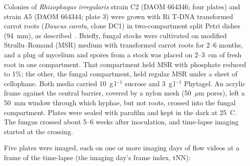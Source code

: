 
Colonies of \textit{Rhizophagus irregularis} strain C2 (DAOM 664346; four plates) and strain A5 (DAOM 664344; plate 3) were grown with Ri T-DNA transformed carrot roots (\textit{Daucus carota}, clone DC1) in two-compartment split Petri dishes (94~mm), as described~\cite{oyarte_galvez_travelling-wave_2025}.
Briefly, fungal stocks were cultivated on modified Strullu--Romand (MSR) medium with transformed carrot roots for 2--6 months, and a plug of mycelium and spores from a stock was placed on 2--3~cm of fresh root in one compartment.
That compartment held MSR with phosphate reduced to 1\%; the other, the fungal compartment, held regular MSR under a sheet of cellophane.
Both media carried 10~g\,l$^{-1}$ sucrose and 3~g\,l$^{-1}$ Phytagel.
An acrylic frame against the central barrier, covered by a nylon mesh (50~$\mu$m pores), left a 50~mm window through which hyphae, but not roots, crossed into the fungal compartment.
Plates were sealed with parafilm and kept in the dark at 25~\textdegree C. The fungus crossed about 5--6 weeks after inoculation, and time-lapse imaging started at the crossing.

Five plates were imaged, each on one or more imaging days of flow videos at a frame of the time-lapse (the imaging day's frame index, tNN):

